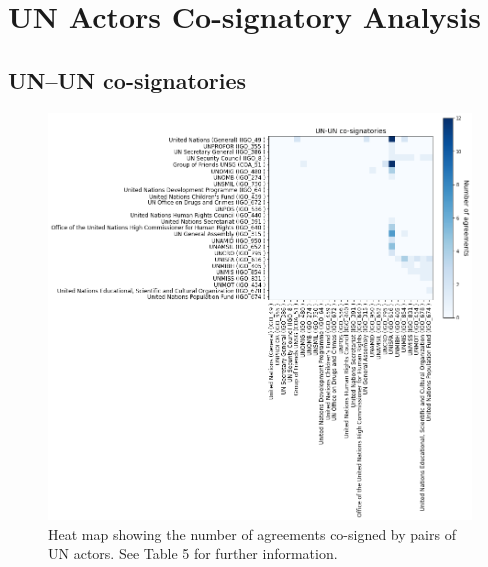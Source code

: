 \documentclass{article}
\begin{document}
\section{UN Actors Co-signatory Analysis}

\subsection{UN--UN co-signatories}

\begin{figure}[H]
\begin{center}
\includegraphics[scale=0.38]{./assets/figure_2.png}
\caption{Heat map showing the number of agreements co-signed by pairs of UN actors. See Table 5 for further information.}
\end{center}
\end{figure}
\end{document}
